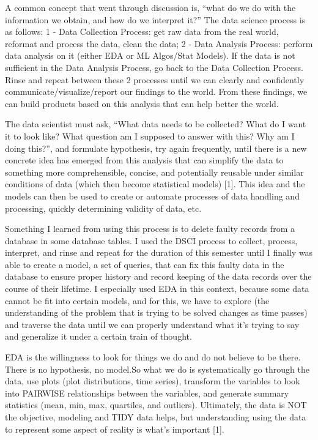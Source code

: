 \documentclass[
]{article}
\begin{document}
A common concept that went through discussion is, ``what do we do with
the information we obtain, and how do we interpret it?'' The data
science process is as follows: 1 - Data Collection Process: get raw data
from the real world, reformat and process the data, clean the data; 2 -
Data Analysis Process: perform data analysis on it (either EDA or ML
Algos/Stat Models). If the data is not sufficient in the Data Analysis
Process, go back to the Data Collection Process. Rinse and repeat
between these 2 processes until we can clearly and confidently
communicate/visualize/report our findings to the world. From these
findings, we can build products based on this analysis that can help
better the world.

The data scientist must ask, ``What data needs to be collected? What do
I want it to look like? What question am I supposed to answer with this?
Why am I doing this?'', and formulate hypothesis, try again frequently,
until there is a new concrete idea has emerged from this analysis that
can simplify the data to something more comprehensible, concise, and
potentially reusable under similar conditions of data (which then become
statistical models) {[}1{]}. This idea and the models can then be used
to create or automate processes of data handling and processing, quickly
determining validity of data, etc.

Something I learned from using this process is to delete faulty records
from a database in some database tables. I used the DSCI process to
collect, process, interpret, and rinse and repeat for the duration of
this semester until I finally was able to create a model, a set of
queries, that can fix this faulty data in the database to ensure proper
history and record keeping of the data records over the course of their
lifetime. I especially used EDA in this context, because some data
cannot be fit into certain models, and for this, we have to explore (the
understanding of the problem that is trying to be solved changes as time
passes) and traverse the data until we can properly understand what it's
trying to say and generalize it under a certain train of thought.

EDA is the willingness to look for things we do and do not believe to be
there. There is no hypothesis, no model.So what we do is systematically
go through the data, use plots (plot distributions, time series),
transform the variables to look into PAIRWISE relationships between the
variables, and generate summary statistics (mean, min, max, quartiles,
and outliers). Ultimately, the data is NOT the objective, modeling and
TIDY data helps, but understanding using the data to represent some
aspect of reality is what's important {[}1{]}.
\end{document}
